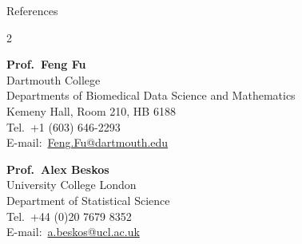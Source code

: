 \documentclass{resume}
\providecommand{\Telefon}{Tel.}
\providecommand{\Letter}{E-mail:}
\begin{document}
\begin{rSection}{References}
\begin{multicols}{2}
\begin{minipage}[t]{\linewidth}
\textbf{Prof.\ Feng Fu}\\
Dartmouth College\\
Departments of Biomedical Data Science and Mathematics\\
Kemeny Hall, Room 210, HB 6188\\
\Telefon\ +1 (603) 646-2293\\
\Letter\ \href{mailto:Feng.Fu@dartmouth.edu}{Feng.Fu@dartmouth.edu}
\end{minipage}\par\medskip

\begin{minipage}[t]{\linewidth}
\textbf{Prof.\ Alex Beskos}\\
University College London\\
Department of Statistical Science\\
\Telefon\ +44 (0)20 7679 8352\\
\Letter\ \href{mailto:a.beskos@ucl.ac.uk}{a.beskos@ucl.ac.uk}
\end{minipage}

\end{multicols}
\end{rSection}
\end{document}
